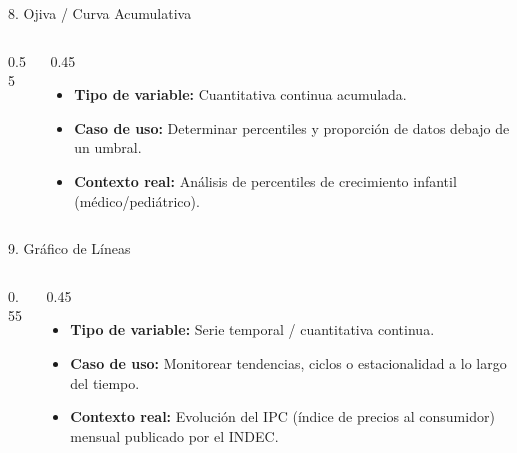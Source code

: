\documentclass[aspectratio=169,10pt]{beamer}
\begin{document}
\begin{frame}{8. Ojiva / Curva Acumulativa}
\begin{columns}
\begin{column}{0.55\textwidth}
\end{column}
\begin{column}{0.45\textwidth}
\begin{itemize}\small
\item \textbf{Tipo de variable:} Cuantitativa continua acumulada.
\item \textbf{Caso de uso:} Determinar percentiles y proporción de datos debajo de un umbral.
\item \textbf{Contexto real:} Análisis de percentiles de crecimiento infantil (médico/pediátrico).
\end{itemize}
\end{column}
\end{columns}
\end{frame}

\begin{frame}{9. Gráfico de Líneas}
\begin{columns}
\begin{column}{0.55\textwidth}
\end{column}
\begin{column}{0.45\textwidth}
\begin{itemize}\small
\item \textbf{Tipo de variable:} Serie temporal / cuantitativa continua.
\item \textbf{Caso de uso:} Monitorear tendencias, ciclos o estacionalidad a lo largo del tiempo.
\item \textbf{Contexto real:} Evolución del IPC (índice de precios al consumidor) mensual publicado por el INDEC.
\end{itemize}
\end{column}
\end{columns}
\end{frame}
\end{document}
